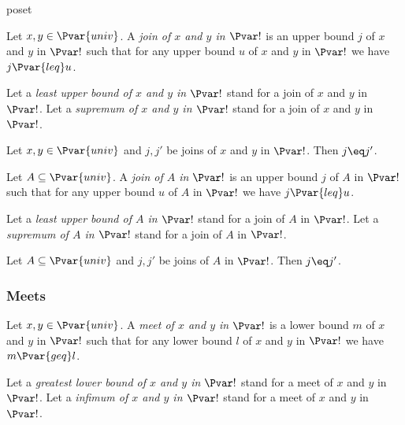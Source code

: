\documentclass{stex}
\begin{document}
\begin{smodule}{poset}
\begin{definition*}[forthel,id=JoinOfPairDef,printid]
  Let $x, y \in \Pvar{univ}$.
  A \emph{join of $x$ and $y$ in $\Pvar!$} is an upper bound $j$ of $x$ and $y$ in $\Pvar!$ such that for any upper bound $u$ of $x$ and $y$ in $\Pvar!$ we have $j {\Pvar{leq}} u$.

  Let a \emph{least upper bound of $x$ and $y$ in $\Pvar!$} stand for a join of $x$ and $y$ in $\Pvar!$.
  Let a \emph{supremum of $x$ and $y$ in $\Pvar!$} stand for a join of $x$ and $y$ in $\Pvar!$.
\end{definition*}

\begin{proposition*}[forthel,id=JoinOfPairIsUniqueThm,printid]
  Let $x,y\in\Pvar{univ}$ and $j, j'$ be joins of $x$ and $y$ in $\Pvar!$.
  Then $j\eq j'$.
\end{proposition*}
    
\begin{definition*}[forthel,id=JoinOfSetDef,printid]
  Let $A \subseteq \Pvar{univ}$.
  A \emph{join of $A$ in $\Pvar!$} is an upper bound $j$ of $A$ in $\Pvar!$ such that for any upper bound $u$ of $A$ in $\Pvar!$ we have $j {\Pvar{leq}} u$.

  Let a \emph{least upper bound of $A$ in $\Pvar!$} stand for a join of $A$ in $\Pvar!$.
  Let a \emph{supremum of $A$ in $\Pvar!$} stand for a join of $A$ in $\Pvar!$.
\end{definition*}

\begin{proposition*}[forthel,id=JoinOfSetIsUniqueThm,printid]
  Let $A \subseteq \Pvar{univ}$ and $j, j'$ be joins of $A$ in $\Pvar!$.
  Then $j\eq j'$.
\end{proposition*}

\subsubsection{Meets}

\begin{definition*}[forthel,id=MeetOfPairDef,printid]
  Let $x, y \in \Pvar{univ}$.
  A \emph{meet of $x$ and $y$ in $\Pvar!$} is a lower bound $m$ of $x$ and $y$ in $\Pvar!$ such that for any lower bound $l$ of $x$ and $y$ in $\Pvar!$ we have $m {\Pvar{geq}} l$.

  Let a \emph{greatest lower bound of $x$ and $y$ in $\Pvar!$} stand for a meet of $x$ and $y$ in $\Pvar!$.
  Let a \emph{infimum of $x$ and $y$ in $\Pvar!$} stand for a meet of $x$ and $y$ in $\Pvar!$.
\end{definition*}


\end{smodule}
\end{document}
